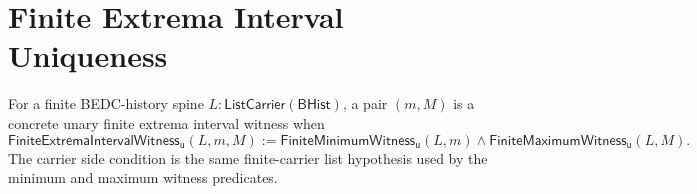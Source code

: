 \section{Finite Extrema Interval Uniqueness}
\label{sec:totalorder-finite-extrema-interval-unique}

\begin{definition}
\label{def:totalorder-prefix-finite-extrema-interval-witness}
For a finite BEDC-history spine $L:\mathsf{ListCarrier}(\mathsf{BHist})$, a
pair $(m,M)$ is a concrete unary finite extrema interval witness when
$$
\mathsf{FiniteExtremaIntervalWitness}_{\mathsf{u}}(L,m,M)
:=
\mathsf{FiniteMinimumWitness}_{\mathsf{u}}(L,m)
\land
\mathsf{FiniteMaximumWitness}_{\mathsf{u}}(L,M).
$$
The carrier side condition is the same finite-carrier list hypothesis used by
the minimum and maximum witness predicates.
\end{definition}

